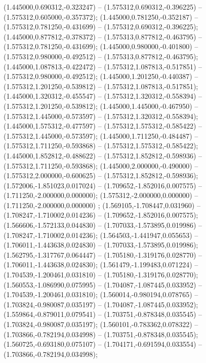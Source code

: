  (1.445000,0.690312,-0.323247) -- (1.575312,0.690312,-0.396225) -- (1.575312,0.605000,-0.357372);
 (1.445000,0.781250,-0.352187) -- (1.575312,0.781250,-0.431699) -- (1.575312,0.690312,-0.396225);
 (1.445000,0.877812,-0.378372) -- (1.575313,0.877812,-0.463795) -- (1.575312,0.781250,-0.431699);
 (1.445000,0.980000,-0.401800) -- (1.575312,0.980000,-0.492512) -- (1.575313,0.877812,-0.463795);
 (1.445000,1.087813,-0.422472) -- (1.575312,1.087813,-0.517851) -- (1.575312,0.980000,-0.492512);
 (1.445000,1.201250,-0.440387) -- (1.575312,1.201250,-0.539812) -- (1.575312,1.087813,-0.517851);
 (1.445000,1.320312,-0.455547) -- (1.575312,1.320312,-0.558394) -- (1.575312,1.201250,-0.539812);
 (1.445000,1.445000,-0.467950) -- (1.575312,1.445000,-0.573597) -- (1.575312,1.320312,-0.558394);
 (1.445000,1.575312,-0.477597) -- (1.575312,1.575312,-0.585422) -- (1.575312,1.445000,-0.573597);
 (1.445000,1.711250,-0.484487) -- (1.575312,1.711250,-0.593868) -- (1.575312,1.575312,-0.585422);
 (1.445000,1.852812,-0.488622) -- (1.575312,1.852812,-0.598936) -- (1.575312,1.711250,-0.593868);
 (1.445000,2.000000,-0.490000) -- (1.575312,2.000000,-0.600625) -- (1.575312,1.852812,-0.598936);
 (1.572006,-1.851023,0.017024) -- (1.709652,-1.852016,0.007575) -- (1.711250,-2.000000,0.000000);
 (1.575312,-2.000000,0.000000) -- (1.711250,-2.000000,0.000000) ;
 (1.569105,-1.708447,0.031960) -- (1.708247,-1.710002,0.014236) -- (1.709652,-1.852016,0.007575);
 (1.566606,-1.572133,0.044830) -- (1.707033,-1.573895,0.019986) -- (1.708247,-1.710002,0.014236);
 (1.564503,-1.441947,0.055653) -- (1.706011,-1.443638,0.024830) -- (1.707033,-1.573895,0.019986);
 (1.562795,-1.317767,0.064447) -- (1.705180,-1.319176,0.028770) -- (1.706011,-1.443638,0.024830);
 (1.561479,-1.199483,0.071224) -- (1.704539,-1.200461,0.031810) -- (1.705180,-1.319176,0.028770);
 (1.560553,-1.086990,0.075995) -- (1.704087,-1.087445,0.033952) -- (1.704539,-1.200461,0.031810);
 (1.560014,-0.980194,0.078765) -- (1.703824,-0.980087,0.035197) -- (1.704087,-1.087445,0.033952);
 (1.559864,-0.879011,0.079541) -- (1.703751,-0.878348,0.035545) -- (1.703824,-0.980087,0.035197);
 (1.560101,-0.783362,0.078322) -- (1.703866,-0.782194,0.034998) -- (1.703751,-0.878348,0.035545);
 (1.560725,-0.693180,0.075107) -- (1.704171,-0.691594,0.033554) -- (1.703866,-0.782194,0.034998);
